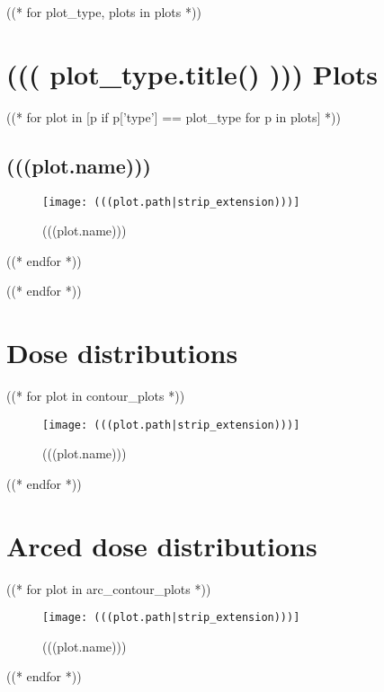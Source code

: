 \documentclass[12pt]{article}
\begin{document}
\clearpage

\tableofcontents


((* for plot_type, plots in plots *))
	\section{((( plot_type.title() ))) Plots}
		
		((* for plot in [p if p['type'] == plot_type for p in plots] *))
			\subsection{(((plot.name)))}
			\begin{figure}[H]
			\centering
			\texttt{[image: (((plot.path|strip\_extension)))]}
			\caption{(((plot.name)))}
			\label{fig:(((plot.slug)))}
			\end{figure}
		((* endfor *))

((* endfor *))

\section{Dose distributions}

((* for plot in contour_plots *))
	\begin{figure}[H]
	\centering
	\texttt{[image: (((plot.path|strip\_extension)))]}
	\caption{(((plot.name)))}
	\label{fig:(((plot.slug)))}
	\end{figure}
((* endfor *))

\section{Arced dose distributions}
((* for plot in arc_contour_plots *))
	\begin{figure}[H]
	\centering
	\texttt{[image: (((plot.path|strip\_extension)))]}
	\caption{(((plot.name)))}
	\label{fig:(((plot.slug)))}
	\end{figure}
((* endfor *))
\end{document}
